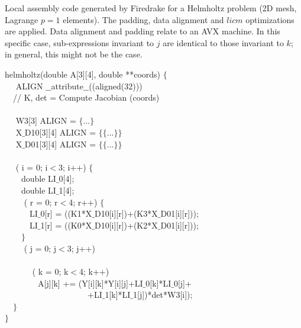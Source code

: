 \documentclass[conference]{IEEEtran}
\begin{document}
\begin{algorithm}[t]
\small
\caption{Local assembly code generated by Firedrake for a Helmholtz problem (2D mesh, Lagrange $p=1$ elements). The padding, data alignment and $licm$ optimizations are applied. Data alignment and padding relate to an AVX machine. In this specific case, sub-expressions invariant to $j$ are identical to those invariant to $k$; in general, this might not be the case.}
\label{code:helmholtz-licm}
 helmholtz(double A[3][4], double **coords) $\lbrace$\\
~~ ALIGN $\_\_$attribute$\_\_$((aligned(32))) \\
~~// K, det = Compute Jacobian (coords) \\
~~\\
~~ W3[3] ALIGN = $\lbrace$...$\rbrace$\\
~~ X$\_$D10[3][4] ALIGN = $\lbrace\lbrace$...$\rbrace\rbrace$\\
~~ X$\_$D01[3][4] ALIGN = $\lbrace\lbrace$...$\rbrace\rbrace$\\
~~\\
~~ ( i = 0; i$<$3; i++) $\lbrace$ \\
~~~~double LI$\_$0[4];\\
~~~~double LI$\_$1[4];\\
~~~~ ( r = 0; r$<$4; r++) $\lbrace$ \\
~~~~~~LI$\_$0[r] = ((K1*X$\_$D10[i][r])+(K3*X$\_$D01[i][r]));\\
~~~~~~LI$\_$1[r] = ((K0*X$\_$D10[i][r])+(K2*X$\_$D01[i][r]));\\
~~~~$\rbrace$\\
~~~~ ( j = 0; j$<$3; j++) \\
~~~~~~\\
~~~~~~ ( k = 0; k$<$4; k++) \\
~~~~~~~~A[j][k] += (Y[i][k]*Y[i][j]+LI$\_$0[k]*LI$\_$0[j]+\\
~~~~~~~~~~~~~~~~~~~~+LI$\_$1[k]*LI$\_$1[j])*det*W3[i]);\\
~~$\rbrace$\\
$\rbrace$
\end{algorithm}


\end{document}
